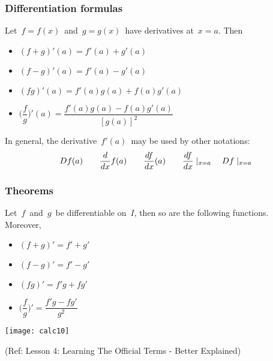 






 \begin{frame}[fragile] \frametitle{Differentiation formulas}
Let\ $f=f(x)$\ and\ $g=g(x)$\ have derivatives at\ $x=a$. Then
\begin{itemize}
	\item $(f+g)'(a) = f'(a) + g'(a)$\\
	\item $(f-g)'(a) = f'(a) - g'(a)$\\
	\item $(fg)'(a) = f'(a)g(a) + f(a)g'(a)$\\
	\item$\big( \dfrac{f}{g} \big)'(a) = \dfrac{f'(a)g(a) - f(a)g'(a)}{[g(a)]^2}$
\end{itemize}

In general, the derivative\ $f'(a)$\  may be used by other notations:
\[ D f(a) \qquad \frac{d {} }{d x} f(a) \qquad \frac{d {f} }{d x}(a) \qquad \frac{d {f} }{d x} \mid_{x=a} \quad D f \mid_{x=a} \]


\end{frame}

 \begin{frame}[fragile] \frametitle{Theorems}
Let\ $f$\ and\ $g$\ be differentiable on\ $I$, then so are the following functions. Moreover,
\begin{itemize}
	\item $(f+g)' = f' + g'$\\
	\item $(f-g)' = f' - g'$\\
	\item $(fg)' = f'g + fg'$\\
	\item $\big( \dfrac{f}{g} \big)' = \dfrac{f'g - fg'}{g^2}$
\end{itemize}

\begin{center}
\texttt{[image: calc10]}
\end{center}

\tiny{(Ref: Lesson 4: Learning The Official Terms - Better Explained)}






\end{frame}


